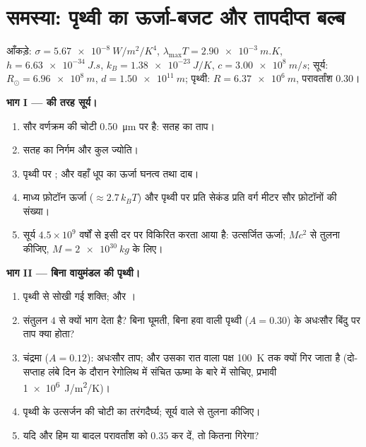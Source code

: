\section{समस्या: पृथ्वी का ऊर्जा-बजट और तापदीप्त बल्ब}

\begin{problem}[{सप्ताहांत समस्या --- सूर्य से तंतु तक
कृष्णिकाएँ}]\label{pb:b2:thermal-radiation:1}
आँकड़े: $\sigma = \qty{5.67e-8}{W/m^2/K^4}$, $\lambda_{\max}T = \qty{2.90e-3}{m.K}$,
$h = \qty{6.63e-34}{J.s}$, $k_B = \qty{1.38e-23}{J/K}$, $c = \qty{3.00e8}{m/s}$;
सूर्य: $R_\odot = \qty{6.96e8}{m}$, $d = \qty{1.50e11}{m}$; पृथ्वी: $R =
\qty{6.37e6}{m}$, परावर्तांश $0.30$।

\textbf{भाग I ---  की तरह सूर्य।}
\begin{enumerate}
  \item सौर वर्णक्रम की चोटी \qty{0.50}{\micro m} पर है: सतह का
        ताप।
  \item सतह का निर्गम और कुल ज्योति।
  \item पृथ्वी पर ; और वहाँ धूप का ऊर्जा घनत्व तथा दाब।
  \item माध्य फ़ोटॉन ऊर्जा ($\approx 2.7\,k_BT$) और पृथ्वी पर प्रति सेकंड
        प्रति वर्ग मीटर सौर फ़ोटॉनों की संख्या।
  \item सूर्य $4.5 \times 10^9$ वर्षों से इसी दर पर विकिरित करता आया है:
        उत्सर्जित ऊर्जा; $Mc^2$ से तुलना कीजिए, $M = \qty{2e30}{kg}$ के लिए।
\end{enumerate}

\textbf{भाग II --- बिना वायुमंडल की पृथ्वी।}
\begin{enumerate}[resume]
  \item पृथ्वी से सोखी गई शक्ति; और ।
  \item संतुलन $4$ से क्यों भाग देता है? बिना घूमती, बिना हवा वाली
        पृथ्वी ($A = 0.30$) के अधःसौर बिंदु पर ताप
        क्या होता?
  \item चंद्रमा ($A = 0.12$): अधःसौर ताप; और उसका रात वाला
        पक्ष \qty{100}{K} तक क्यों गिर जाता है (दो-सप्ताह लंबे दिन के दौरान
        रेगोलिथ में संचित ऊष्मा के बारे में सोचिए, प्रभावी \qty{1e6}{J/m^2/K})।
  \item पृथ्वी के उत्सर्जन की चोटी का तरंगदैर्घ्य; सूर्य वाले से
        तुलना कीजिए।
  \item यदि और हिम या बादल परावर्तांश को $0.35$ कर दें, तो 
        कितना गिरेगा?
\end{enumerate}


\end{problem}
